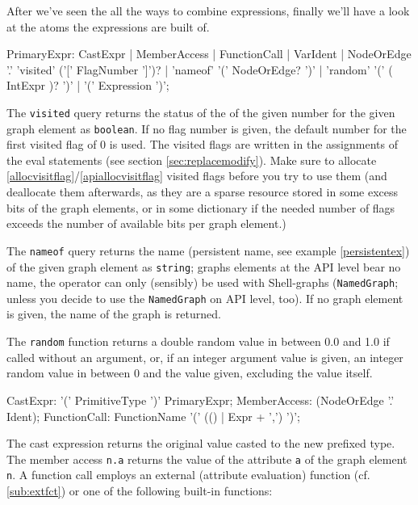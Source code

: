 After we've seen the all the ways to combine expressions, finally we'll have a look at the atoms the expressions are built of.

\begin{rail}
  PrimaryExpr: CastExpr
  		| MemberAccess
  		| FunctionCall
  		| VarIdent
  		| NodeOrEdge '.' 'visited' ('[' FlagNumber ']')?
  		| 'nameof' '(' NodeOrEdge? ')'
  		| 'random' '(' ( IntExpr )? ')'
  		| '(' Expression ')';
\end{rail}

The \texttt{visited} query returns the status of the  of the given number for the given graph element as \texttt{boolean}.
If no flag number is given, the default number for the first visited flag of 0 is used.
The visited flags are written in the assignments of the eval statements (see section \ref{sec:replacemodify}).
Make sure to allocate \ref{allocvisitflag}/\ref{apiallocvisitflag} visited flags before you try to use them
(and deallocate them afterwards, as they are a sparse resource stored in some excess bits of the graph elements, or in some dictionary if the needed number of flags exceeds the number of available bits per graph element.)

The \texttt{nameof} query returns the name (persistent name, see example \ref{persistentex}) of the given graph element as \texttt{string};
graphs elements at the API level bear no name, the operator can only (sensibly) be used with Shell-graphs (\texttt{NamedGraph}; unless you decide to use the \texttt{NamedGraph} on API level, too).
If no graph element is given, the name of the graph is returned.

The \texttt{random} function returns a double random value in between 0.0 and 1.0 if called without an argument,
or, if an integer argument value is given, an integer random value in between 0 and the value given, excluding the value itself.

\begin{rail}
  CastExpr: '(' PrimitiveType ')' PrimaryExpr;
  MemberAccess: (NodeOrEdge '.' Ident);
  FunctionCall: FunctionName '(' (() | Expr + ',') ')';
\end{rail}

The cast expression returns the original value casted to the new prefixed type.
The member access \texttt{n.a} returns the value of the attribute \texttt{a} of the graph element \texttt{n}.
A function call employs an external (attribute evaluation) function (cf. \ref{sub:extfct}) or one of the following built-in functions:

